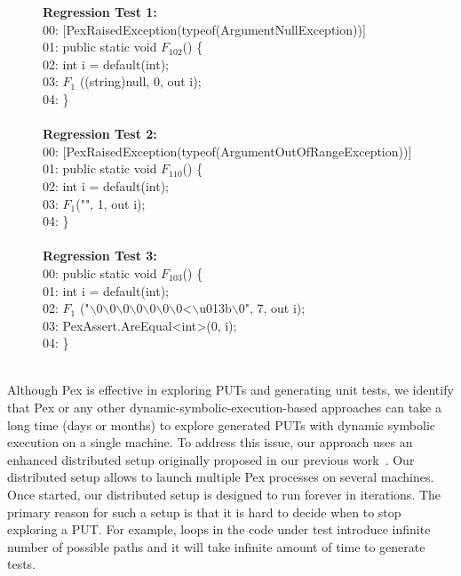 \begin{figure}[t]
\begin{CodeOut}
\textbf{Regression Test 1:}\\
00: [PexRaisedException(typeof(ArgumentNullException))]\\
01: public static void $F_{102}$() \{\\
02: \hspace*{0.2in}int i = default(int); \\
03: \hspace*{0.2in}$F_1$ ((string)null, 0, out i);\\
04: \}\\
\\
\textbf{Regression Test 2:}\\
00: [PexRaisedException(typeof(ArgumentOutOfRangeException))]\\
01: public static void $F_{110}$() \{\\
02: \hspace*{0.2in}int i = default(int);\\
03: \hspace*{0.2in}$F_1$("", 1, out i);\\
04: \}\\
\\
\textbf{Regression Test 3:}\\
00: public static void $F_{103}$() \{\\
01: \hspace*{0.2in}int i = default(int);\\
02: \hspace*{0.2in}$F_1$ ("$\backslash$0$\backslash$0$\backslash$0$\backslash$0$\backslash$0$\backslash$0$\backslash$0<$\backslash$u013b$\backslash$0", 7, out i); \\
03: \hspace*{0.2in}PexAssert.AreEqual<int>(0, i);\\
04: \}\\
\\
\end{CodeOut}\vspace*{-5ex}
\vspace*{-5ex}
\end{figure}

Although Pex is effective in exploring PUTs and generating unit tests, we identify that Pex or any other dynamic-symbolic-execution-based approaches can take a long time (days or months) to explore generated PUTs with dynamic symbolic execution on a single machine. To address this issue, our approach uses an enhanced distributed setup originally proposed in our previous work~\cite{tillman:pexwhite}. Our distributed setup allows to launch multiple Pex processes on several machines. Once started, our distributed setup is designed to run forever in iterations. The primary reason for such a setup is that it is hard to decide when to stop exploring a PUT. For example, loops in the code under test introduce infinite number of possible paths and it will take infinite amount of time to generate tests.

